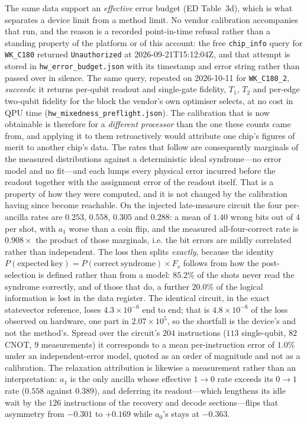 \documentclass[aps,prxquantum,reprint,superscriptaddress]{revtex4-2}
\begin{document}
The same data support an \emph{effective} error budget (ED Table~3d), which is
what separates a device limit from a method limit. No vendor calibration
accompanies that run, and the reason is a recorded point-in-time refusal rather
than a standing property of the platform or of this account: the free
\texttt{chip\_info} query for \texttt{WK\_C180} returned \texttt{Unauthorized} at
2026-09-21T15:12:04Z, and that attempt is stored in
\texttt{hw\_error\_budget.json} with its timestamp and error string rather than
passed over in silence. The same query, repeated on 2026-10-11 for
\texttt{WK\_C180\_2}, \emph{succeeds}: it returns per-qubit readout and
single-gate fidelity, $T_1$, $T_2$ and per-edge two-qubit fidelity for the block
the vendor's own optimiser selects, at no cost in QPU time
(\texttt{hw\_mixedness\_preflight.json}). The calibration that is now obtainable
is therefore for a \emph{different processor} than the one these counts came
from, and applying it to them retroactively would attribute one chip's figures of
merit to another chip's data. The rates that follow are consequently marginals of
the measured distributions against a deterministic ideal syndrome---no error
model and no fit---and each lumps every physical error incurred before the
readout together with the assignment error of the readout itself. That is a
property of how they were computed, and it is not changed by the calibration
having since become reachable. On the injected late-measure circuit the four per-ancilla
rates are $0.253$, $0.558$, $0.305$ and $0.288$: a mean of $1.40$ wrong bits out
of $4$ per shot, with $a_1$ worse than a coin flip, and the measured
all-four-correct rate is $0.908\times$ the product of those marginals, i.e. the
bit errors are mildly correlated rather than independent. The loss then splits
\emph{exactly}, because the identity
$P(\mathrm{expected\ key})=P(\mathrm{correct\ syndrome})\times F_s$
follows from how the post-selection is defined rather than from a model:
$85.2\%$ of the shots never read the syndrome correctly, and of
those that do, a further $20.0\%$ of the logical information is lost in the data
register. The identical circuit, in the exact statevector reference, loses
$4.3\times10^{-6}$ end to end; that is $4.8\times10^{-6}$ of the loss observed on
hardware, one part in $2.07\times10^{5}$, so the shortfall is the device's and
not the method's. Spread over the circuit's $204$ instructions ($113$
single-qubit, $82$ CNOT, $9$ measurements) it corresponds to a mean
per-instruction error of $1.0\%$ under an independent-error model, quoted as an
order of magnitude and not as a calibration. The relaxation attribution is
likewise a measurement rather than an interpretation: $a_1$ is the only ancilla
whose effective $1\to0$ rate exceeds its $0\to1$ rate ($0.558$ against $0.389$),
and deferring its readout---which lengthens its idle wait by the $126$
instructions of the recovery and decode sections---flips that asymmetry from
$-0.301$ to $+0.169$ while $a_0$'s stays at $-0.363$.
\end{document}
